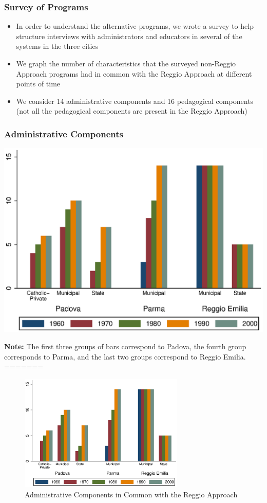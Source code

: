 \documentclass[static]{JJH-Beamer_PAGENOS}
\begin{document}

\begin{frame}
\frametitle{Survey of Programs}
\begin{itemize}
	\item In order to understand the alternative programs, we wrote a survey to help structure interviews with administrators and educators in several of the systems in the three cities
	\item We graph the number of characteristics that the surveyed non-Reggio Approach programs had in common with the Reggio Approach at different points of time
	\item We consider 14 administrative components and 16 pedagogical components (not all the pedagogical components are present in the Reggio Approach)
\end{itemize}
\end{frame}

\begin{frame}
\frametitle{Administrative Components}
\begin{center}
\includegraphics[scale=0.7]{../../output/aggregateAdministrative.eps}
\end{center}
\tiny{\textbf{Note:} The first three groups of bars correspond to Padova, the fourth group corresponds to Parma, and the last two groups correspond to Reggio Emilia.}
=======
\centering
\begin{figure}[H]
\caption{Administrative Components in Common with the Reggio Approach}
\includegraphics[width=0.7\textwidth]{../../output/aggregateAdministrative.eps}
\end{figure}
\end{frame}
\end{document}
